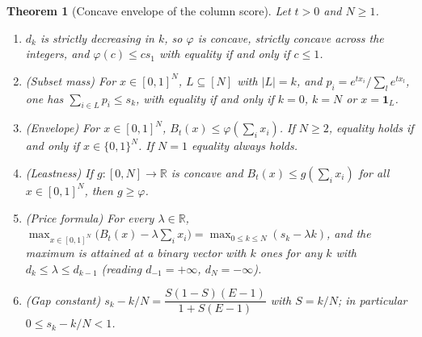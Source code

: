 \documentclass[11pt]{article}
\theoremstyle{plain}
\newtheorem{theorem}{Theorem}[section]
\theoremstyle{definition}
\theoremstyle{remark}
\begin{document}
\begin{theorem}[Concave envelope of the column score]\label{thm:envelope}
Let $t>0$ and $N\ge1$.
\begin{enumerate}
\item[(a)] $d_k$ is strictly decreasing in $k$, so $\varphi$ is concave, strictly concave across the integers, and $\varphi(c)\le cs_1$ with equality if and only if $c\le1$.
\item[(b)] (Subset mass) For $x\in[0,1]^N$, $L\subseteq[N]$ with $|L|=k$, and $p_i=e^{tx_i}/\sum_le^{tx_l}$, one has $\sum_{i\in L}p_i\le s_k$, with equality if and only if $k=0$, $k=N$ or $x=\mathbf 1_L$.
\item[(c)] (Envelope) For $x\in[0,1]^N$, $B_t(x)\le\varphi(\sum_ix_i)$. If $N\ge2$, equality holds if and only if $x\in\{0,1\}^N$. If $N=1$ equality always holds.
\item[(d)] (Leastness) If $g:[0,N]\to\mathbb R$ is concave and $B_t(x)\le g(\sum_ix_i)$ for all $x\in[0,1]^N$, then $g\ge\varphi$.
\item[(e)] (Price formula) For every $\lambda\in\mathbb R$, $\max_{x\in[0,1]^N}\bigl(B_t(x)-\lambda\sum_ix_i\bigr)=\max_{0\le k\le N}(s_k-\lambda k)$, and the maximum is attained at a binary vector with $k$ ones for any $k$ with $d_k\le\lambda\le d_{k-1}$ (reading $d_{-1}=+\infty$, $d_N=-\infty$).
\item[(f)] (Gap constant) $s_k-k/N=\dfrac{S(1-S)(E-1)}{1+S(E-1)}$ with $S=k/N$; in particular $0\le s_k-k/N<1$.
\end{enumerate}
\end{theorem}
\end{document}
